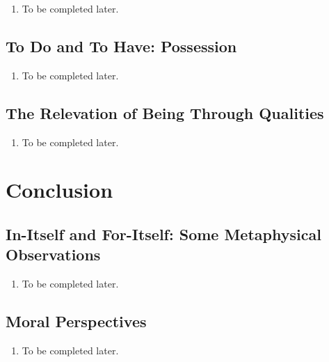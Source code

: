 \begin{enumerate}
  \item To be completed later.
\end{enumerate}

\subsection{To Do and To Have: Possession}

\begin{enumerate}
  \item To be completed later.
\end{enumerate}

\subsection{The Relevation of Being Through Qualities}

\begin{enumerate}
  \item To be completed later.
\end{enumerate}

\section{Conclusion}

\subsection{In-Itself and For-Itself: Some Metaphysical Observations}

\begin{enumerate}
  \item To be completed later.
\end{enumerate}

\subsection{Moral Perspectives}

\begin{enumerate}
  \item To be completed later.
\end{enumerate}
